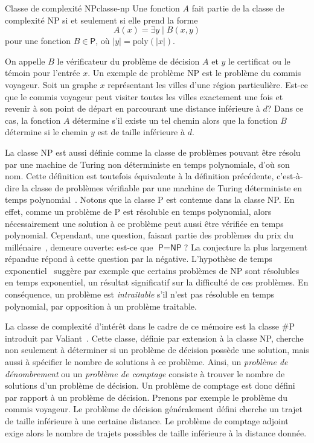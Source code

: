 \begin{maindefinition}{Classe de complexité \textsf{NP}}{classe-np}
    Une fonction $A$ fait partie de la classe de complexité \textsf{NP} si et seulement si elle prend la forme
    \begin{equation*}
        A(x) = \exists y \mid B(x,y)
    \end{equation*}
    pour une fonction $B \in  \textsf{P}$, où $\lvert y \rvert = \mathrm{poly}(\lvert x \rvert)$.
\end{maindefinition}

On appelle $B$ le vérificateur du problème de décision $A$ et $y$ le certificat ou le témoin pour l'entrée $x$. Un exemple de problème \textsf{NP} est le problème du commis voyageur. Soit un graphe $x$ représentant les villes d'une région particulière. Est-ce que le commis voyageur peut visiter toutes les villes exactement une fois et revenir à son point de départ en parcourant une distance inférieure à $d$? Dans ce cas, la fonction $A$ détermine s'il existe un tel chemin alors que la fonction $B$ détermine si le chemin $y$ est de taille inférieure à $d$.

La classe \textsf{NP} est aussi définie comme la classe de problèmes pouvant être résolu par une machine de Turing non déterministe en temps polynomiale, d'où son nom. Cette définition est toutefois équivalente à la définition précédente, c'est-à-dire la classe de problèmes vérifiable par une machine de Turing déterministe en temps polynomial~\cite{sipserIntroductionTheoryComputation1996}. Notons que la classe \textsf{P} est contenue dans la classe \textsf{NP}. En effet, comme un problème de \textsf{P} est résoluble en temps polynomial, alors nécessairement une solution à ce problème peut aussi être vérifiée en temps polynomial. Cependant, une question, faisant partie des problèmes du prix du millénaire~\cite{carlsonMillenniumPrizeProblems2006}, demeure ouverte: est-ce que $\textsf{P} = \textsf{NP}$? La conjecture la plus largement répandue répond à cette question par la négative. L'hypothèse de temps exponentiel~\cite{impagliazzoComplexityKSAT2001} suggère par exemple que certains problèmes de \textsf{NP} sont résolubles en temps exponentiel, un résultat significatif sur la difficulté de ces problèmes. En conséquence, un problème est \textit{intraitable} s'il n'est pas résoluble en temps polynomial, par opposition à un problème traitable. 

La classe de complexité d'intérêt dans le cadre de ce mémoire est la classe \textsf{\#P} introduit par Valiant~\cite{valiantComplexityComputingPermanent1979}. Cette classe, définie par extension à la classe \textsf{NP}, cherche non seulement à déterminer si un problème de décision possède une solution, mais aussi à spécifier le nombre de solutions à ce problème. Ainsi, un \textit{problème de dénombrement} ou un \textit{problème de comptage} consiste à trouver le nombre de solutions d'un problème de décision. Un problème de comptage est donc défini par rapport à un problème de décision. Prenons par exemple le problème du commis voyageur. Le problème de décision généralement défini cherche un trajet de taille inférieure à une certaine distance. Le problème de comptage adjoint exige alors le nombre de trajets possibles de taille inférieure à la distance donnée. 

